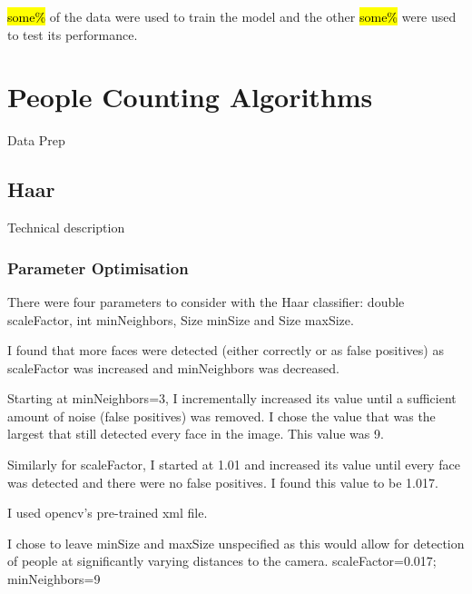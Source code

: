 \documentclass{article}
\begin{document}
\hl{some\%} of the data were used to train the model and the other \hl{some\%} were used to test its performance.

\section{People Counting Algorithms}
Data Prep

\subsection{Haar}
Technical description
\subsubsection{Parameter Optimisation}
There were four parameters to consider with the Haar classifier: double scaleFactor, int minNeighbors, Size minSize and Size maxSize.

I found that more faces were detected (either correctly or as false positives) as scaleFactor was increased and minNeighbors was decreased.

Starting at minNeighbors=3, I incrementally increased its value until a sufficient amount of noise (false positives) was removed. I chose the value that was the largest that still detected every face in the image. This value was 9.

Similarly for scaleFactor, I started at 1.01 and increased its value until every face was detected and there were no false positives. I found this value to be 1.017. 

I used opencv's pre-trained xml file.

I chose to leave minSize and maxSize unspecified as this would allow for detection of people at significantly varying distances to the camera.
scaleFactor=0.017; minNeighbors=9
\end{document}

